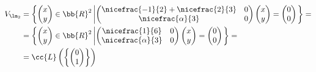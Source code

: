 \begin{ejercicio}
\begin{enumerate}
\begin{align*}
        V_{\lm_2} &= \left\{
            \begin{pmatrix}
                x \\ y
            \end{pmatrix} \in \bb{R}^2 \left|
            \begin{pmatrix}
                \nicefrac{-1}{2}+\nicefrac{2}{3} & 0\\
                \nicefrac{\alpha}{3} & 0
            \end{pmatrix}\begin{pmatrix}
                x \\ y
            \end{pmatrix} = \begin{pmatrix}
                0 \\ 0
            \end{pmatrix}
            \right.
        \right\}=\\
        &= \left\{
            \begin{pmatrix}
                x \\ y
            \end{pmatrix} \in \bb{R}^2 \left|
            \begin{pmatrix}
                \nicefrac{1}{6} & 0\\
                \nicefrac{\alpha}{3} & 0
            \end{pmatrix}\begin{pmatrix}
                x \\ y
            \end{pmatrix} = \begin{pmatrix}
                0 \\ 0
            \end{pmatrix}
            \right.
        \right\}=\\
        &= \cc{L}\left(\left\{\begin{pmatrix}
                0 \\ 1
            \end{pmatrix}\right\}\right)
    \end{align*}


\end{enumerate}
\end{ejercicio}
